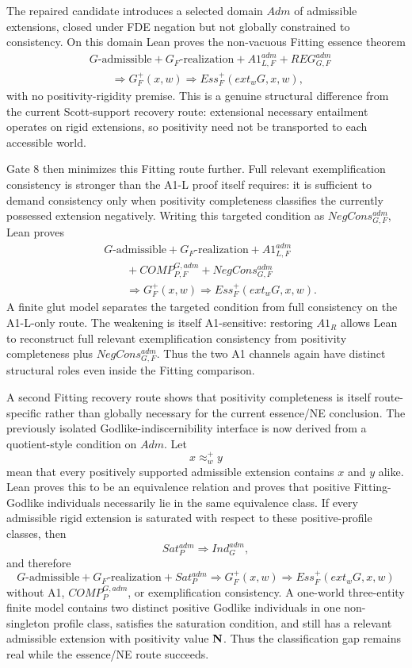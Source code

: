 The repaired candidate introduces a selected domain \(Adm\) of admissible extensions, closed under FDE negation but not globally constrained to consistency. On this domain Lean proves the non-vacuous Fitting essence theorem
\[
\begin{split}
  &G\text{-admissible}
  +G_F\text{-realization}
  +A1_{L,F}^{adm}
  +REG_{G,F}^{adm}\\
  &\qquad\Longrightarrow
  G_F^+(x,w)\Rightarrow Ess_F^+(ext_wG,x,w),
\end{split}
\]
with no positivity-rigidity premise. This is a genuine structural difference from the current Scott-support recovery route: extensional necessary entailment operates on rigid extensions, so positivity need not be transported to each accessible world.

Gate 8 then minimizes this Fitting route further. Full relevant exemplification consistency is stronger than the A1-L proof itself requires: it is sufficient to demand consistency only when positivity completeness classifies the currently possessed extension negatively. Writing this targeted condition as \(NegCons_{G,F}^{adm}\), Lean proves
\[
\begin{split}
  &G\text{-admissible}
  +G_F\text{-realization}
  +A1_{L,F}^{adm}\\
  &\qquad
  +COMP_{P,F}^{G,adm}
  +NegCons_{G,F}^{adm}\\
  &\qquad\Longrightarrow
  G_F^+(x,w)\Rightarrow Ess_F^+(ext_wG,x,w).
\end{split}
\]
A finite glut model separates the targeted condition from full consistency on the A1-L-only route. The weakening is itself A1-sensitive: restoring \(A1_R\) allows Lean to reconstruct full relevant exemplification consistency from positivity completeness plus \(NegCons_{G,F}^{adm}\). Thus the two A1 channels again have distinct structural roles even inside the Fitting comparison.

A second Fitting recovery route shows that positivity completeness is itself route-specific rather than globally necessary for the current essence/NE conclusion. The previously isolated Godlike-indiscernibility interface is now derived from a quotient-style condition on \(Adm\). Let
\[
  x\approx_w^+y
\]
mean that every positively supported admissible extension contains \(x\) and \(y\) alike. Lean proves this to be an equivalence relation and proves that positive Fitting-Godlike individuals necessarily lie in the same equivalence class. If every admissible rigid extension is saturated with respect to these positive-profile classes, then
\[
  Sat_P^{adm}\Longrightarrow Ind_G^{adm},
\]
and therefore
\[
  G\text{-admissible}
  +G_F\text{-realization}
  +Sat_P^{adm}
  \Longrightarrow
  G_F^+(x,w)\Rightarrow Ess_F^+(ext_wG,x,w)
\]
without A1, \(COMP_P^{G,adm}\), or exemplification consistency. A one-world three-entity finite model contains two distinct positive Godlike individuals in one non-singleton profile class, satisfies the saturation condition, and still has a relevant admissible extension with positivity value \(\mathbf{N}\). Thus the classification gap remains real while the essence/NE route succeeds.

